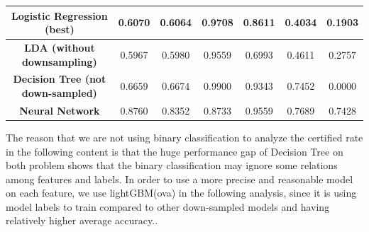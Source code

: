 \documentclass{article}
\begin{document}
\begin{table}[H]
{\begin{tabular}{|c|c|c|cccc|}
\textbf{Logistic Regression (best)} & 0.6070                                                                                          & 0.6064                                                                                     & \multicolumn{1}{c|}{0.9708}             & \multicolumn{1}{c|}{0.8611}                       & \multicolumn{1}{c|}{0.4034}          & 0.1903             \\ \hline
\textbf{LDA (without downsampling)} & 0.5967                                                                                          & 0.5980                                                                                     & \multicolumn{1}{c|}{0.9559}             & \multicolumn{1}{c|}{0.6993}                       & \multicolumn{1}{c|}{0.4611}          & 0.2757             \\ \hline
\textbf{Decision Tree (not down-sampled)}              & 0.6659                                                                                          & 0.6674                                                                                     & \multicolumn{1}{c|}{0.9900}             & \multicolumn{1}{c|}{0.9343}                       & \multicolumn{1}{c|}{0.7452}          & 0.0000             \\ \hline
\textbf{Neural Network}              & 0.8760                                                                                          & 0.8352                                                                                     & \multicolumn{1}{c|}{0.8733}             & \multicolumn{1}{c|}{0.9559}                       & \multicolumn{1}{c|}{0.7689}          & 0.7428             \\ \hline
\end{tabular}%
}
\end{table}

The reason that we are not using binary classification to analyze the certified rate in the following content is that the huge performance gap of Decision Tree on both problem shows that the binary classification may ignore some relations among features and labels. In order to use a more precise and reasonable model on each feature, we use lightGBM(ova) in the following analysis, since it is using model labels to train compared to other down-sampled models and having relatively higher average accuracy.. 
\end{document}
